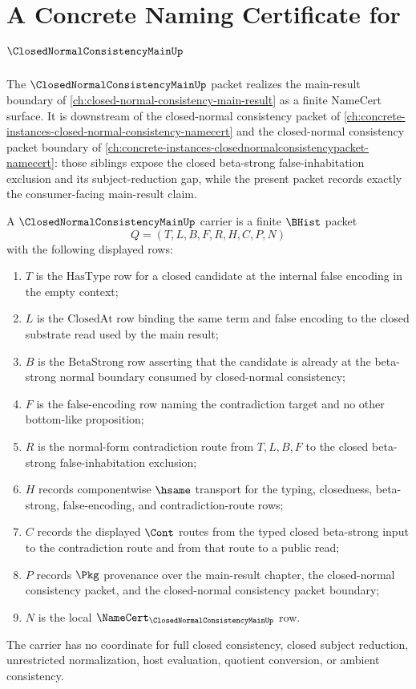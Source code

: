 \chapter{A Concrete Naming Certificate for $\ClosedNormalConsistencyMainUp$}
\label{ch:concrete-instances-closednormalconsistencymain-namecert}

The $\ClosedNormalConsistencyMainUp$ packet realizes the main-result boundary of \autoref{ch:closed-normal-consistency-main-result} as a finite NameCert surface. It is downstream of the closed-normal consistency packet of \autoref{ch:concrete-instances-closed-normal-consistency-namecert} and the closed-normal consistency packet boundary of \autoref{ch:concrete-instances-closednormalconsistencypacket-namecert}: those siblings expose the closed beta-strong false-inhabitation exclusion and its subject-reduction gap, while the present packet records exactly the consumer-facing main-result claim.

\begin{definition}
\label{def:closed-normal-consistency-main-carrier}
A $\ClosedNormalConsistencyMainUp$ carrier is a finite $\BHist$ packet
$$
Q=(T,L,B,F,R,H,C,P,N)
$$
with the following displayed rows:
\begin{enumerate}
\item $T$ is the $\mathrm{HasType}$ row for a closed candidate at the internal false encoding in the empty context;
\item $L$ is the $\mathrm{ClosedAt}$ row binding the same term and false encoding to the closed substrate read used by the main result;
\item $B$ is the $\mathrm{BetaStrong}$ row asserting that the candidate is already at the beta-strong normal boundary consumed by closed-normal consistency;
\item $F$ is the false-encoding row naming the contradiction target and no other bottom-like proposition;
\item $R$ is the normal-form contradiction route from $T,L,B,F$ to the closed beta-strong false-inhabitation exclusion;
\item $H$ records componentwise $\hsame$ transport for the typing, closedness, beta-strong, false-encoding, and contradiction-route rows;
\item $C$ records the displayed $\Cont$ routes from the typed closed beta-strong input to the contradiction route and from that route to a public read;
\item $P$ records $\Pkg$ provenance over the main-result chapter, the closed-normal consistency packet, and the closed-normal consistency packet boundary;
\item $N$ is the local $\NameCert_{\ClosedNormalConsistencyMainUp}$ row.
\end{enumerate}
The carrier has no coordinate for full closed consistency, closed subject reduction, unrestricted normalization, host evaluation, quotient conversion, or ambient consistency.
\end{definition}

